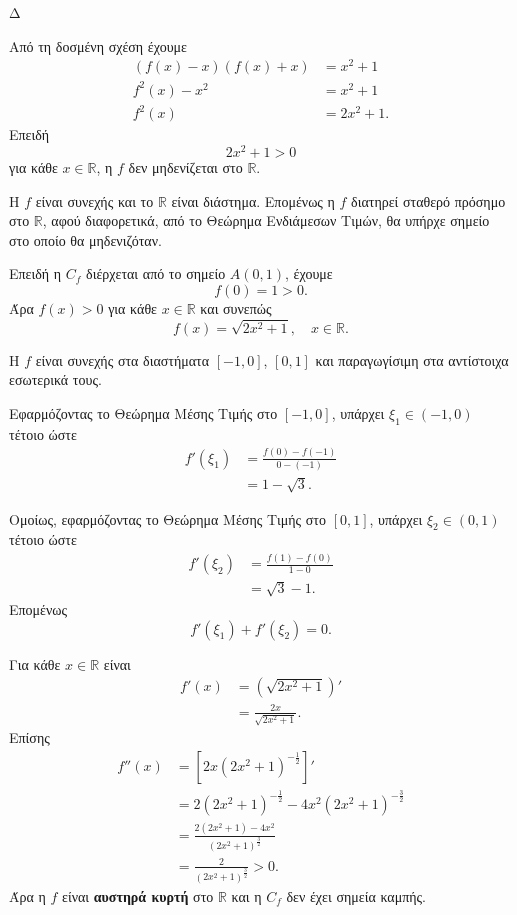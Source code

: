 \begin{thema}{Δ}
\begin{erwthma}
\item Από τη δοσμένη σχέση έχουμε
\begin{align*}
(f(x)-x)(f(x)+x)&=x^2+1\\
f^2(x)-x^2&=x^2+1\\
f^2(x)&=2x^2+1.
\end{align*}
Επειδή
\[
2x^2+1>0
\]
για κάθε $x\in\mathbb{R}$, η $f$ δεν μηδενίζεται στο $\mathbb{R}$.

Η $f$ είναι συνεχής και το $\mathbb{R}$ είναι διάστημα. Επομένως η $f$ διατηρεί σταθερό πρόσημο στο $\mathbb{R}$, αφού διαφορετικά, από το Θεώρημα Ενδιάμεσων Τιμών, θα υπήρχε σημείο στο οποίο θα μηδενιζόταν.

Επειδή η $C_f$ διέρχεται από το σημείο $A(0,1)$, έχουμε
\[
f(0)=1>0.
\]
Άρα $f(x)>0$ για κάθε $x\in\mathbb{R}$ και συνεπώς
\[
{f(x)=\sqrt{2x^2+1}},\quad x\in\mathbb{R}.
\]

\item Η $f$ είναι συνεχής στα διαστήματα $[-1,0]$, $[0,1]$ και παραγωγίσιμη στα αντίστοιχα εσωτερικά τους.

Εφαρμόζοντας το Θεώρημα Μέσης Τιμής στο $[-1,0]$, υπάρχει $\xi_1\in(-1,0)$ τέτοιο ώστε
\begin{align*}
f'(\xi_1)
&=\frac{f(0)-f(-1)}{0-(-1)}\\
&=1-\sqrt{3}.
\end{align*}

Ομοίως, εφαρμόζοντας το Θεώρημα Μέσης Τιμής στο $[0,1]$, υπάρχει $\xi_2\in(0,1)$ τέτοιο ώστε
\begin{align*}
f'(\xi_2)
&=\frac{f(1)-f(0)}{1-0}\\
&=\sqrt{3}-1.
\end{align*}
Επομένως
\[
{f'(\xi_1)+f'(\xi_2)=0}.
\]

\item Για κάθε $x\in\mathbb{R}$ είναι
\begin{align*}
f'(x)
&=\left(\sqrt{2x^2+1}\right)'\\
&=\frac{2x}{\sqrt{2x^2+1}}.
\end{align*}
Επίσης
\begin{align*}
f''(x)
&=\left[2x(2x^2+1)^{-\frac{1}{2}}\right]'\\
&=2(2x^2+1)^{-\frac{1}{2}}
-4x^2(2x^2+1)^{-\frac{3}{2}}\\
&=\frac{2(2x^2+1)-4x^2}
{(2x^2+1)^{\frac{3}{2}}}\\
&=\frac{2}{(2x^2+1)^{\frac{3}{2}}}>0.
\end{align*}
Άρα η $f$ είναι \textbf{αυστηρά κυρτή} στο $\mathbb{R}$ και η $C_f$ δεν έχει σημεία καμπής.


\end{erwthma}
\end{thema}
